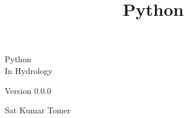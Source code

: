 \documentclass[10pt]{book}
\title{Python}
\newcommand{\theversion}{0.0.0}
\begin{document}

\frontmatter




\newtheorem{ex}{Exercise}[chapter]

\begin{latexonly}

\renewcommand{\blankpage}{\thispagestyle{empty} \quad \newpage}



\thispagestyle{empty}

\begin{flushright}
\vspace*{2.0in}


\vspace{0.25in}


\vfill

\end{flushright}


\blankpage

\pagebreak
\thispagestyle{empty}

\begin{flushright}
\vspace*{2.0in}

\begin{spacing}{3}
{\Huge Python}\\
{\large In Hydrology}
\end{spacing}

\vspace{0.25in}

Version \theversion

\vspace{1in}


{\huge Sat Kumar Tomer } \vspace{0.15in} \\ 




\end{flushright}
\end{latexonly}
\end{document}
